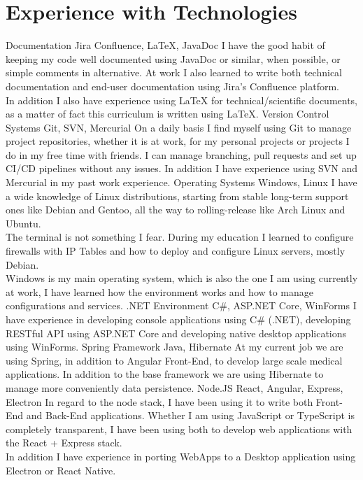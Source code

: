 \section*{Experience with Technologies}
\tech
  {Documentation}
  {Jira Confluence, LaTeX, JavaDoc}
  {I have the good habit of keeping my code well documented using JavaDoc or similar, when possible, or simple comments in alternative. At work I also learned to write both technical documentation and end-user documentation using Jira's Confluence platform.\\
  In addition I also have experience using LaTeX for technical/scientific documents, as a matter of fact this curriculum is written using \LaTeX .}
\tech
  {Version Control Systems}
  {Git, SVN, Mercurial}
  {On a daily basis I find myself using Git to manage project repositories, whether it is at work, for my personal projects or projects I do in my free time with friends. I can manage branching, pull requests and set up CI/CD pipelines without any issues. In addition I have experience using SVN and Mercurial in my past work experience.}
\tech
  {Operating Systems}
  {Windows, Linux}
  {I have a wide knowledge of Linux distributions, starting from stable long-term support ones like Debian and Gentoo, all the way to rolling-release like Arch Linux and Ubuntu.\\
  The terminal is not something I fear. During my education I learned to configure firewalls with IP Tables and how to deploy and configure Linux servers, mostly Debian.\\
  Windows is my main operating system, which is also the one I am using currently at work, I have learned how the environment works and how to manage configurations and services.}
\tech
  {.NET Environment}
  {C\#, ASP.NET Core, WinForms}
  {I have experience in developing console applications using C\# (.NET), developing RESTful API using ASP.NET Core and developing native desktop applications using WinForms.}
\tech
  {Spring Framework}
  {Java, Hibernate}
  {At my current job we are using Spring, in addition to Angular Front-End, to develop large scale medical applications. In addition to the base framework we are using Hibernate to manage more conveniently data persistence.}
\tech
  {Node.JS}
  {React, Angular, Express, Electron}
  {In regard to the node stack, I have been using it to write both Front-End and Back-End applications. Whether I am using JavaScript or TypeScript is completely transparent, I have been using both to develop web applications with the React + Express stack.\\
  In addition I have experience in porting WebApps to a Desktop application using Electron or React Native.}
